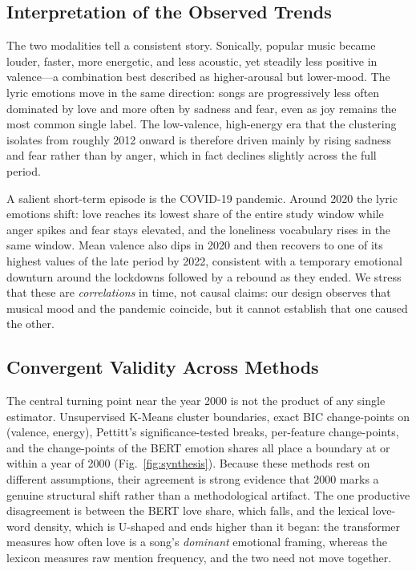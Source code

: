 \documentclass[conference]{IEEEtran}
\begin{document}
\subsection{Interpretation of the Observed Trends}
The two modalities tell a consistent story. Sonically, popular music became
louder, faster, more energetic, and less acoustic, yet steadily less positive in
valence---a combination best described as higher-arousal but lower-mood. The
lyric emotions move in the same direction: songs are progressively less often
dominated by love and more often by sadness and fear, even as joy remains the
most common single label. The low-valence, high-energy era that the clustering
isolates from roughly 2012 onward is therefore driven mainly by rising sadness
and fear rather than by anger, which in fact declines slightly across the full
period.

A salient short-term episode is the COVID-19 pandemic. Around 2020 the lyric
emotions shift: love reaches its lowest share of the entire study window while
anger spikes and fear stays elevated, and the loneliness vocabulary rises in the
same window. Mean valence also dips in 2020 and then recovers to one of its
highest values of the late period by 2022, consistent with a temporary
emotional downturn around the lockdowns followed by a rebound as they ended.
We stress that these are \emph{correlations} in time, not causal claims: our
design observes that musical mood and the pandemic coincide, but it cannot
establish that one caused the other.

\subsection{Convergent Validity Across Methods}
The central turning point near the year 2000 is not the product of any single
estimator. Unsupervised K-Means cluster boundaries, exact BIC change-points on
(valence, energy), Pettitt's significance-tested breaks, per-feature
change-points, and the change-points of the BERT emotion shares all place a
boundary at or within a year of 2000 (Fig.~\ref{fig:synthesis}). Because these
methods rest on different assumptions, their agreement is strong evidence that
2000 marks a genuine structural shift rather than a methodological artifact. The
one productive disagreement is between the BERT love share, which falls, and the
lexical love-word density, which is U-shaped and ends higher than it began: the
transformer measures how often love is a song's \emph{dominant} emotional
framing, whereas the lexicon measures raw mention frequency, and the two need
not move together.
\end{document}
